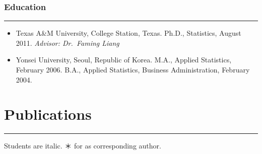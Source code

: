 \documentclass[
]{book}
\begin{document}
\hypertarget{education}{%
\subsubsection*{Education}\label{education}}

\begin{center}\rule{0.5\linewidth}{0.5pt}\end{center}

\begin{itemize}
\item
  Texas A\&M University, College Station, Texas.
  Ph.D., Statistics, August 2011.
  \emph{Advisor: Dr.~Faming Liang}
\item
  Yonsei University, Seoul, Republic of Korea.
  M.A., Applied Statistics, February 2006.
  B.A., Applied Statistics, Business Administration, February 2004.
\end{itemize}

\hypertarget{publications}{%
\section*{Publications}\label{publications}}

\begin{center}\rule{0.5\linewidth}{0.5pt}\end{center}

Students are italic. ＊ for as corresponding author.
\end{document}

